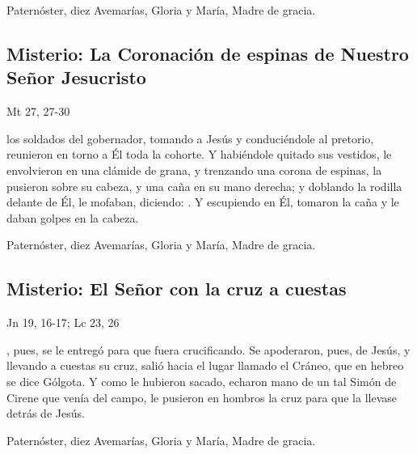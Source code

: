 \documentclass[10pt,a4paper,oneside]{book}
\newcounter{sorrowful-counter}
\begin{document}
\begin{center}
      Paternóster, diez Avemarías, Gloria y María, Madre de gracia.
\end{center}

\subsection*{ Misterio: La Coronación de espinas de Nuestro Señor Jesucristo}
\begin{flushright}
      {\color{red}Mt 27, 27-30}
\end{flushright}
 los soldados del gobernador, tomando a Jesús y conduciéndole al pretorio, reunieron en torno a Él toda la cohorte. Y habiéndole quitado sus vestidos, 
le envolvieron en una clámide de grana, y trenzando una corona de espinas, la pusieron sobre su cabeza, y una caña en su mano derecha; y doblando la rodilla delante de Él, 
le mofaban, diciendo: . Y escupiendo en Él, tomaron la caña y le daban golpes en la cabeza.

\begin{center}
      Paternóster, diez Avemarías, Gloria y María, Madre de gracia.
\end{center}

\subsection*{ Misterio: El Señor con la cruz a cuestas}
\begin{flushright}
      {\color{red}Jn 19, 16-17; Lc 23, 26}
\end{flushright}
, pues, se le entregó para que fuera crucificando. Se apoderaron, pues, de Jesús, y llevando a cuestas su cruz, salió hacia el lugar llamado el Cráneo, 
que en hebreo se dice Gólgota. Y como le hubieron sacado, echaron mano de un tal Simón de Cirene que venía del campo, le pusieron en hombros la cruz para que la llevase detrás de Jesús.

\begin{center}
      Paternóster, diez Avemarías, Gloria y María, Madre de gracia.
\end{center}

\end{document}
